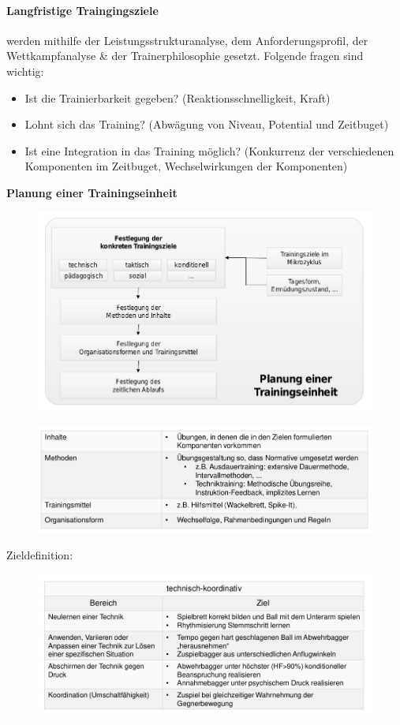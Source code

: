 \paragraph{Langfristige Traingingsziele} werden mithilfe der Leistungsstrukturanalyse, dem Anforderungsprofil, der Wettkampfanalyse \& der Trainerphilosophie gesetzt.
Folgende fragen sind wichtig:
\begin{itemize}
  \item Ist die Trainierbarkeit gegeben? (Reaktionsschnelligkeit, Kraft)
  \item Lohnt sich das Training? (Abwägung von Niveau, Potential und Zeitbuget)
  \item Ist eine Integration in das Training möglich? (Konkurrenz der verschiedenen Komponenten im Zeitbuget, Wechselwirkungen der Komponenten)
\end{itemize}
\textbf{Planung einer Trainingseinheit}\\
\begin{figure}[H]
  \centering
  \includegraphics[width=.7\textwidth]{pictures/trainingssteuerung_planung_trainingseinheit.png}
\end{figure}
\begin{figure}[H]
  \centering
  \includegraphics[width=.7\textwidth]{pictures/trainingssteuerung_planung_trainingseinheiten_komponenten.png}
\end{figure}
Zieldefinition:\\
\begin{figure}[H]
  \centering
  \includegraphics[width=.7\textwidth]{pictures/trainingssteuerung_zieldefinition_koordinativ.png}
\end{figure}

